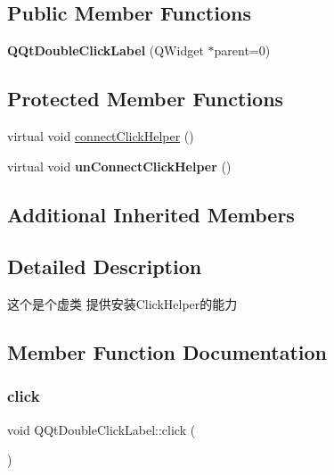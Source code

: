 \subsection*{Public Member Functions}
\begin{DoxyCompactItemize}
\item 
\mbox{\label{class_q_qt_double_click_label_ab118294efa23492cc9617fa9e160dedd}} 
{\bfseries Q\+Qt\+Double\+Click\+Label} (Q\+Widget $\ast$parent=0)
\end{DoxyCompactItemize}
\subsection*{Protected Member Functions}
\begin{DoxyCompactItemize}
\item 
virtual void \mbox{\hyperlink{class_q_qt_double_click_label_a301dbc204a8cfc64e6714dea1aa0b2d6}{connect\+Click\+Helper}} ()
\item 
\mbox{\label{class_q_qt_double_click_label_ad70bb8244980d6c00474dc7a72db9036}} 
virtual void {\bfseries un\+Connect\+Click\+Helper} ()
\end{DoxyCompactItemize}
\subsection*{Additional Inherited Members}


\subsection{Detailed Description}
这个是个虚类 提供安装\+Click\+Helper的能力 

\subsection{Member Function Documentation}
\mbox{\label{class_q_qt_double_click_label_a32c81b1f92fce25f4b484986c1c30c72}} 
\subsubsection{\texorpdfstring{click}{click}}
{\footnotesize\ttfamily void Q\+Qt\+Double\+Click\+Label\+::click (\begin{DoxyParamCaption}{ }\end{DoxyParamCaption})\hspace{0.3cm}{\ttfamily [signal]}}

